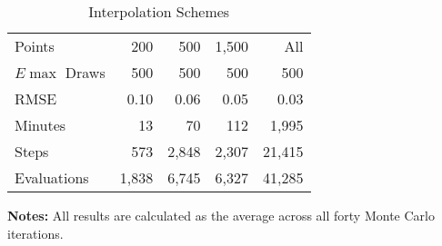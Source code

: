 \begin{table}\onehalfspacing
\begin{center}
\begin{threeparttable}
  \captionsetup{width=30cm}
  \caption{Interpolation Schemes}
  \label{Interpolation Schemes}
  \begin{tabular}{lrrrr}\toprule
  Points      & 200 & 500 & 1,500  & All \\
  $E\max$ Draws & 500 &  500 &   500 & 500 \\
  \midrule
  RMSE        & 0.10 &   0.06 &    0.05 &  0.03  \\
  Minutes     &  13 &      70 &    112 &   1,995 \\
  Steps       &  573 &   2,848 &    2,307 &  21,415 \\
  Evaluations & 1,838 &   6,745 &    6,327 &  41,285 \\
  \bottomrule
  \end{tabular}\scriptsize
  \begin{tablenotes}\item \textbf{Notes:} All results are calculated as the average across all forty Monte Carlo iterations.
  \end{tablenotes}
  \end{threeparttable}
  \end{center}
\end{table}
